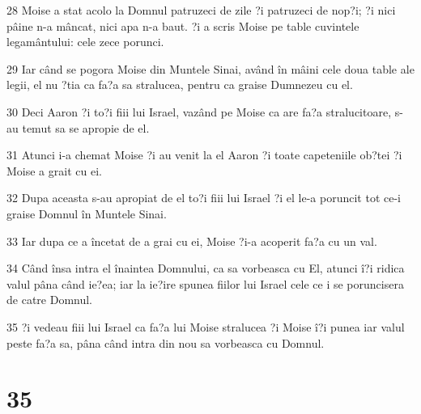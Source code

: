 \par 28 Moise a stat acolo la Domnul patruzeci de zile ?i patruzeci de nop?i; ?i nici pâine n-a mâncat, nici apa n-a baut. ?i a scris Moise pe table cuvintele legamântului: cele zece porunci.
\par 29 Iar când se pogora Moise din Muntele Sinai, având în mâini cele doua table ale legii, el nu ?tia ca fa?a sa stralucea, pentru ca graise Dumnezeu cu el.
\par 30 Deci Aaron ?i to?i fiii lui Israel, vazând pe Moise ca are fa?a stralucitoare, s-au temut sa se apropie de el.
\par 31 Atunci i-a chemat Moise ?i au venit la el Aaron ?i toate capeteniile ob?tei ?i Moise a grait cu ei.
\par 32 Dupa aceasta s-au apropiat de el to?i fiii lui Israel ?i el le-a poruncit tot ce-i graise Domnul în Muntele Sinai.
\par 33 Iar dupa ce a încetat de a grai cu ei, Moise ?i-a acoperit fa?a cu un val.
\par 34 Când însa intra el înaintea Domnului, ca sa vorbeasca cu El, atunci î?i ridica valul pâna când ie?ea; iar la ie?ire spunea fiilor lui Israel cele ce i se poruncisera de catre Domnul.
\par 35 ?i vedeau fiii lui Israel ca fa?a lui Moise stralucea ?i Moise î?i punea iar valul peste fa?a sa, pâna când intra din nou sa vorbeasca cu Domnul.

\chapter{35}

